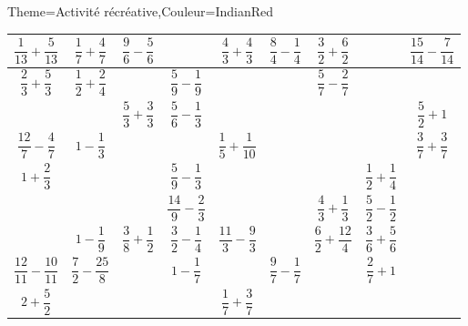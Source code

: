 \begin{Maquette}[Cours]{Theme={Activité récréative},Couleur={IndianRed}}
\begin{center}
{\begin{tabular}{|*{3}{C{1}|}|*{3}{C{1}|}|*{3}{C{1}|}}
            \hline
               \!$\dfrac1{13}+\dfrac5{13}$\! & $\dfrac17+\dfrac47$ & $\dfrac96-\dfrac56$ & & $\dfrac43+\dfrac43$ & $\dfrac84-\dfrac14$ & $\dfrac32+\dfrac62$ & & \!$\dfrac{15}{14}-\dfrac{7}{14}\!$ \\
            \hline
               $\dfrac23+\dfrac53$ & $\dfrac12+\dfrac24$ & & $\dfrac59-\dfrac19$ & & & $\dfrac57-\dfrac27$ & & \\
            \hline
               & & $\dfrac53+\dfrac33$ & $\dfrac56-\dfrac13$ & & & & & $\dfrac52+1$\\
               \hline
               \hline
               $\dfrac{12}7-\dfrac47$ & $1-\dfrac13$ & & & $\dfrac15+\dfrac{1}{10}$ & & & & $\dfrac37+\dfrac37$ \\
            \hline
               $1+\dfrac23$ & & & $\dfrac59-\dfrac13$ & & & & $\dfrac12+\dfrac14$ & \\
            \hline
               & & & $\dfrac{14}{9}-\dfrac23$ & & & $\dfrac43+\dfrac13$ & $\dfrac52-\dfrac12$ & \\
            \hline
            \hline
               & $1-\dfrac19$ & $\dfrac38+\dfrac12$ & $\dfrac32-\dfrac14$ & $\dfrac{11}3-\dfrac93$ & & $\dfrac62+\dfrac{12}4$ & $\dfrac36+\dfrac56$ & \\
            \hline
               \!$\dfrac{12}{11}-\dfrac{10}{11}$\! & $\dfrac72-\dfrac{25}{8}$ &  & $1-\dfrac17$ & & $\dfrac97-\dfrac17$ & & $\dfrac27+1$ & \\
            \hline
               $2+\dfrac52$ & & & & $\dfrac17+\dfrac37$ & & & & \\
            \hline
         \end{tabular}}
      \end{center}

\end{Maquette}